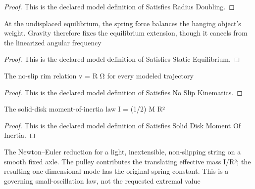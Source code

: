 \begin{proof}
  This is the declared model definition of Satisfies Radius Doubling.
\end{proof}
\begin{definition}
  \label{def:physics:phyx-mini-0235:phyxminiproblems-problemphyxmini0235-satisfiesstaticequilibrium}
  At the undisplaced equilibrium, the spring force balances the hanging object's weight. Gravity therefore fixes the equilibrium extension, though it cancels from the linearized angular frequency
\end{definition}
\begin{proof}
  This is the declared model definition of Satisfies Static Equilibrium.
\end{proof}
\begin{definition}
  \label{def:physics:phyx-mini-0235:phyxminiproblems-problemphyxmini0235-satisfiesnoslipkinematics}
  The no-slip rim relation v = R Ω for every modeled trajectory
\end{definition}
\begin{proof}
  This is the declared model definition of Satisfies No Slip Kinematics.
\end{proof}
\begin{definition}
  \label{def:physics:phyx-mini-0235:phyxminiproblems-problemphyxmini0235-satisfiessoliddiskmomentofinertia}
  The solid-disk moment-of-inertia law I = (1/2) M R²
\end{definition}
\begin{proof}
  This is the declared model definition of Satisfies Solid Disk Moment Of Inertia.
\end{proof}
\begin{definition}
  \label{def:physics:phyx-mini-0235:phyxminiproblems-problemphyxmini0235-satisfiessmalloscillationreduction}
  The Newton--Euler reduction for a light, inextensible, non-slipping string on a smooth fixed axle. The pulley contributes the translating effective mass I/R²; the resulting one-dimensional mode has the original spring constant. This is a governing small-oscillation law, not the requested extremal value
\end{definition}
